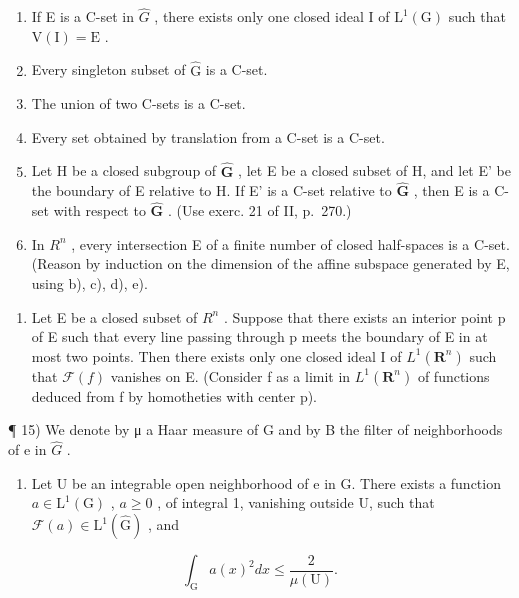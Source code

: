\begin{enumerate}
\def\labelenumi{\alph{enumi})}
\item
  If E is a C-set in \(\widehat{G}\) , there exists only one closed ideal I of \(\mathrm{L}^1 (\mathrm{G})\) such that \(\mathrm{V(I)} = \mathrm{E}\) .
\item
  Every singleton subset of \(\widehat{\mathrm{G}}\) is a C-set.
\item
  The union of two C-sets is a C-set.
\item
  Every set obtained by translation from a C-set is a C-set.
\item
  Let H be a closed subgroup of \(\widehat{\mathbf{G}}\) , let E be a closed subset of H, and let E' be the boundary of E relative to H. If E' is a C-set relative to \(\widehat{\mathbf{G}}\) , then E is a C-set with respect to \(\widehat{\mathbf{G}}\) . (Use exerc. 21 of II, p.~270.)
\item
  In \(R^{n}\) , every intersection E of a finite number of closed half-spaces is a C-set. (Reason by induction on the dimension of the affine subspace generated by E, using b), c), d), e).
\end{enumerate}

\begin{enumerate}
\def\labelenumi{\arabic{enumi})}
\setcounter{enumi}{13}
\tightlist
\item
  Let E be a closed subset of \(R^{n}\) . Suppose that there exists an interior point p of E such that every line passing through p meets the boundary of E in at most two points. Then there exists only one closed ideal I of \(L^{1}(\mathbf{R}^{n})\) such that \(\mathcal{F}(f)\) vanishes on E. (Consider f as a limit in \(L^{1}(\mathbf{R}^{n})\) of functions deduced from f by homotheties with center p).
\end{enumerate}

¶ 15) We denote by μ a Haar measure of G and by B the filter of neighborhoods of e in \(\widehat{G}\) .

\begin{enumerate}
\def\labelenumi{\alph{enumi})}
\tightlist
\item
  Let U be an integrable open neighborhood of e in G. There exists a function \(a \in \mathrm{L}^{1}(\mathrm{G})\) , \(a \geqslant 0\) , of integral 1, vanishing outside U, such that \(\mathcal{F}(a) \in \mathrm{L}^{1}(\widehat{\mathrm{G}})\) , and
\end{enumerate}

\[
\int_ {\mathrm{G}} a (x) ^ {2} d x \leqslant \frac {2}{\mu (\mathrm{U})}.
\]

